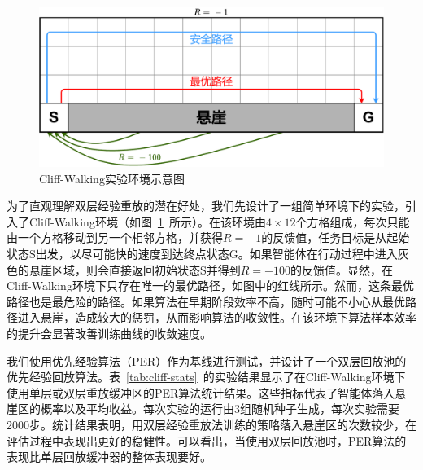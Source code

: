 \begin{figure}[t]
\centering
\includegraphics[width=\textwidth]{figures/cliff-env.pdf}
\caption{Cliff-Walking实验环境示意图}
\label{fig:cliff-env}
\end{figure}


为了直观理解双层经验重放的潜在好处，我们先设计了一组简单环境下的实验，引入了Cliff-Walking环境（如图~\ref{fig:cliff-env}~所示）。在该环境由$4\times 12$个方格组成，每次只能由一个方格移动到另一个相邻方格，并获得$R=-1$的反馈值，任务目标是从起始状态S出发，以尽可能快的速度到达终点状态G。如果智能体在行动过程中进入灰色的悬崖区域，则会直接返回初始状态S并得到$R=-100$的反馈值。显然，在Cliff-Walking环境下只存在唯一的最优路径，如图中的红线所示。然而，这条最优路径也是最危险的路径。如果算法在早期阶段效率不高，随时可能不小心从最优路径进入悬崖，造成较大的惩罚，从而影响算法的收敛性。在该环境下算法样本效率的提升会显著改善训练曲线的收敛速度。

我们使用优先经验算法（PER）作为基线进行测试，并设计了一个双层回放池的优先经验回放算法。表~\ref{tab:cliff-stats}~的实验结果显示了在Cliff-Walking环境下使用单层或双层重放缓冲区的PER算法统计结果。这些指标代表了智能体落入悬崖区的概率以及平均收益。每次实验的运行由3组随机种子生成，每次实验需要2000步。统计结果表明，用双层经验重放法训练的策略落入悬崖区的次数较少，在评估过程中表现出更好的稳健性。可以看出，当使用双层回放池时，PER算法的表现比单层回放缓冲器的整体表现要好。

